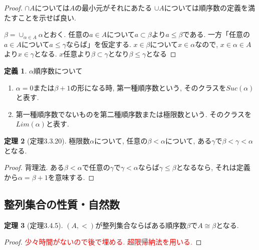 \documentclass[dvipdfmx,a4paper,11pt]{article}
\theoremstyle{definition}
\newtheorem{thm}{定理}
\newtheorem{dfn}[thm]{定義}
\newcommand{\xr}[1]{\textcolor{red}{#1}}
\begin{document}
\begin{proof}
$\cap A$については$A$の最小元がそれにあたる
$\cup A$については順序数の定義を満たすことを示せば良い.

$\beta = \cup_{\alpha \in A }\alpha$とおく.
任意の$a\in A$について$a \subset \beta$より$a \le  \beta$である.
一方「任意の$a\in A$について$a \le \gamma$ならば」を仮定する.
$x \in \beta$について$x \in \alpha$なので, $x \in \alpha \in A$より$x \in \gamma$となる.
$x$任意より$\beta \subset \gamma$となり$\beta \le \gamma$となる
\end{proof}

 \begin{tcolorbox}
 [colback = white, colframe = green!35!black, fonttitle = \bfseries,breakable = true]
\begin{dfn}
$\alpha$順序数について
\begin{enumerate}
\item $\alpha = 0$または$\beta+1$の形になる時, 第一種順序数という, そのクラスを$Suc(\alpha)$と表す. 
\item 第一種順序数でないものを第二種順序数または極限数という. そのクラスを$Lim(\alpha)$と表す. 
\end{enumerate}
\end{dfn}
\end{tcolorbox}

 \begin{tcolorbox}
 [colback = white, colframe = green!35!black, fonttitle = \bfseries,breakable = true]
\begin{thm}[定理3.3.20]
極限数$\alpha$について, 任意の$\beta < \alpha$について, ある$\gamma$で$\beta < \gamma < \alpha$となる.
\end{thm}
\end{tcolorbox}

\begin{proof}
背理法. ある$\beta < \alpha$で任意の$\gamma$で$\gamma < \alpha$ならば$\gamma \le \beta$となるなら, それは定義から$\alpha=\beta+1$を意味する. 
\end{proof}

\subsection{整列集合の性質・自然数}

 \begin{tcolorbox}
 [colback = white, colframe = green!35!black, fonttitle = \bfseries,breakable = true]
\begin{thm}[定理3.4.5]
\label{thm-tanaka-3.4.5}
$(A,<)$が整列集合ならばある順序数$\beta$で$A \cong \beta$となる. 
\end{thm}
\end{tcolorbox}
\begin{proof}
\xr{少々時間がないので後で埋める. 超限帰納法を用いる.}
\end{proof}
\end{document}
